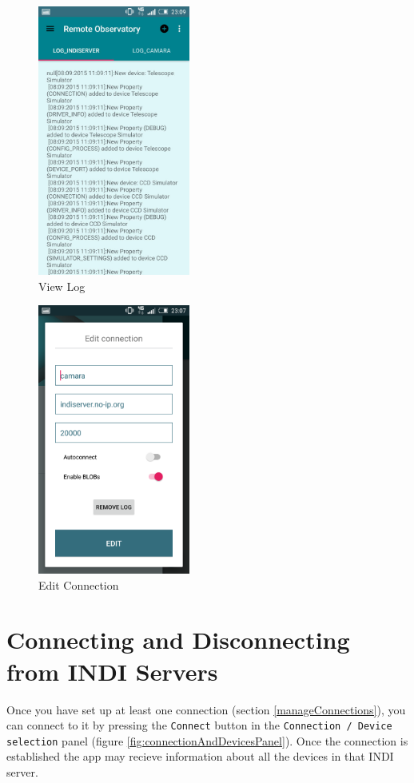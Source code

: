 \begin{figure}
 \centering
 \includegraphics[width=5cm]{../images/log2.jpg}
 \caption{View Log}
 \label{fig:viewLog}
\end{figure}

\begin{figure}
 \centering
 \includegraphics[width=5cm]{../images/editConnection2.png}
 \caption{Edit Connection}
 \label{fig:editConnection}
\end{figure}



\section{Connecting and Disconnecting from INDI Servers}

Once you have set up at least one connection (section \ref{manageConnections}), you can connect to it by pressing the \texttt{Connect} button in the \texttt{Connection / Device selection} panel (figure \ref{fig:connectionAndDevicesPanel}). Once the connection is established the app may recieve information about all the devices in that INDI server.

